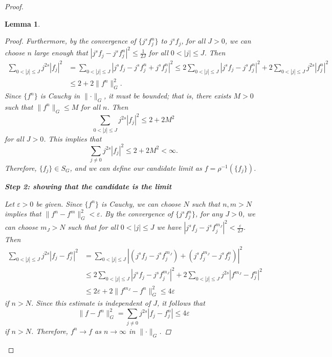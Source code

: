 \documentclass{homework}
\newtheorem{lemma}{Lemma}
\begin{document}
\begin{arabicparts}
\begin{proof}
\begin{lemma}
\begin{proof}
				Furthermore, by the convergence of $\{j^sf^n_j\}$ to $j^sf_j$, for all $J > 0$, we can choose $n$ large enough that $|j^sf_j - j^sf^n_j|^2 \le \frac{1}{2J}$ for all $0 < |j| \le J$. Then
				\begin{align}
					\sum_{0<|j|\le J}j^{2s}|f_j|^2 &= \sum_{0<|j|\le J}|j^sf_j - j^sf^n_j + j^sf^n_j|^2\le 2\sum_{0<|j|\le J} |j^sf_j - j^sf^n_j|^2  +2\sum_{0<|j|\le J}j^{2s}|f^n_j|^2\\
					&\le 2 +2\lVert f^n\rVert_G^2.
				\end{align}
				Since $\{f^n\}$ is Cauchy in $\lVert\cdot\rVert_G$, it must be bounded; that is, there exists $M > 0$ such that $\lVert f^n\rVert_G \le M$ for all $n$. Then
				\begin{equation}
					\sum_{0<|j|\le J}j^{2s}|f_j|^2 \le 2 + 2M^2
				\end{equation}
				for all $J > 0$. This implies that
				\begin{equation}
					\sum_{j\ne 0}j^{2s}|f_j|^2 \le 2 + 2M^2 < \infty.
				\end{equation}
				Therefore, $\{f_j\} \in S_G$, and we can define our candidate limit as $f = \rho^{-1}(\{f_j\})$.
				
				\textbf{Step 2: showing that the candidate is the limit}
				
				Let $\varepsilon > 0$ be given. Since $\{f^n\}$ is Cauchy, we can choose $N$ such that $n,m > N$ implies that $\lVert f^n - f^m\rVert_G^2 < \varepsilon$. By the convergence of $\{j^sf^n_j\}$, for any $J > 0$, we can choose $m_J > N$ such that for all $0 < |j| \le J$ we have $|j^sf_j-j^sf^{m_J}_j|^2 < \frac{\varepsilon}{2J}$. Then
				\newcommand{\lJ}{{0<|j|\le J}}
				\begin{align}
					\sum_\lJ j^{2s}|f_j - f^n_j|^2 &= \sum_\lJ |(j^sf_j - j^sf^{m_J}_j) + (j^sf^{m_J}_j - j^sf^n_j)|^2 \\
					&\le 2\sum_\lJ |j^sf_j - j^sf^{m_J}_j|^2 + 2\sum_\lJ j^{2s}|f^{m_J}-f^n_j|^2\\
					&\le 2\varepsilon + 2\lVert f^{m_J} -f^n\rVert_G^2 \le 4\varepsilon
				\end{align}
				if $n > N$. Since this estimate is independent of $J$, it follows that
				\begin{equation}
					\lVert f - f^n\rVert_G^2 = \sum_{j\ne 0}j^{2s}|f_j-f^n_j| \le 4\varepsilon
				\end{equation}			
				if $n > N$. Therefore, $f^n \to f$ as $n\to \infty$ in $\lVert \cdot \rVert_G$.
			\end{proof}
		\end{lemma}
		

\end{proof}
\end{arabicparts}
\end{document}
